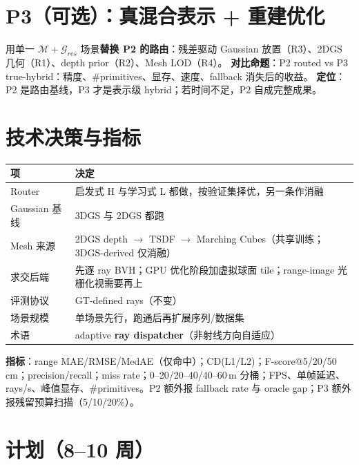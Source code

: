 \documentclass[10pt,a4paper]{article}
\begin{document}
\section{P3（可选）：真混合表示 + 重建优化}

用单一 $\mathcal{M}+\mathcal{G}_{res}$ 场景\textbf{替换 P2 的路由}：残差驱动 Gaussian 放置（R3）、2DGS 几何（R1）、depth prior（R2）、Mesh LOD（R4）。
\textbf{对比命题}：P2 routed vs P3 true-hybrid：精度、\#primitives、显存、速度、fallback 消失后的收益。
\textbf{定位}：P2 是路由基线，P3 才是表示级 hybrid；若时间不足，P2 自成完整成果。

\section{技术决策与指标}

\begin{center}\small
\begin{tabularx}{\textwidth}{@{}p{3.0cm}Y@{}}
\toprule
\textbf{项} & \textbf{决定}\\
\midrule
Router & 启发式 H 与学习式 L 都做，按验证集择优，另一条作消融\\
Gaussian 基线 & 3DGS 与 2DGS 都跑\\
Mesh 来源 & 2DGS depth $\rightarrow$ TSDF $\rightarrow$ Marching Cubes（共享训练；3DGS-derived 仅消融）\\
求交后端 & 先逐 ray BVH；GPU 优化阶段加虚拟球面 tile；range-image 光栅化视需要再上\\
评测协议 & GT-defined rays（不变）\\
场景规模 & 单场景先行，跑通后再扩展序列/数据集\\
术语 & adaptive \textbf{ray dispatcher}（非射线方向自适应）\\
\bottomrule
\end{tabularx}
\end{center}

\textbf{指标}：range MAE/RMSE/MedAE（仅命中）；CD(L1/L2)；F-score@5/20/50\,cm；precision/recall；miss rate；0--20/20--40/40--60\,m 分桶；FPS、单帧延迟、rays/s、峰值显存、\#primitives。P2 额外报 fallback rate 与 oracle gap；P3 额外报残留预算扫描（5/10/20\%）。

\section{计划（8--10 周）}
\end{document}
